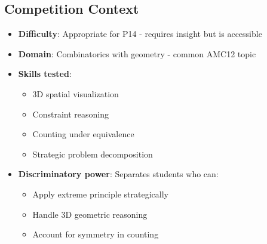 \documentclass[]{article}
\begin{document}
\subsection*{Competition Context}
\begin{itemize}[leftmargin=*]
    \item \textbf{Difficulty}: Appropriate for P14 - requires insight but is accessible
    \item \textbf{Domain}: Combinatorics with geometry - common AMC12 topic
    \item \textbf{Skills tested}: 
    \begin{itemize}
        \item 3D spatial visualization
        \item Constraint reasoning
        \item Counting under equivalence
        \item Strategic problem decomposition
    \end{itemize}
    \item \textbf{Discriminatory power}: Separates students who can:
    \begin{itemize}
        \item Apply extreme principle strategically
        \item Handle 3D geometric reasoning
        \item Account for symmetry in counting
    \end{itemize}
\end{itemize}
\end{document}
